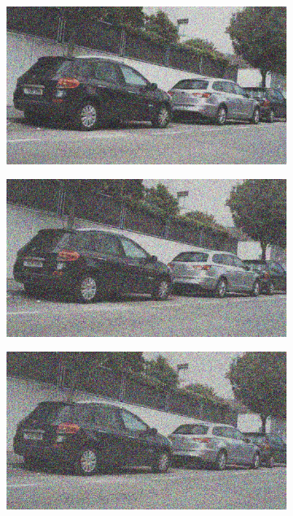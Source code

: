 \documentclass[a4paper]{ctexart}
\begin{document}
\begin{figure}[htbp]
\begin{subfigure}{0.08\textwidth}
			\label{fig：Gamma=0.6, Gauss Noise = 0.4}
		\end{subfigure}
		\begin{subfigure}{0.08\textwidth}
			\captionsetup{font=scriptsize}
			\includegraphics[width=\linewidth]{picture/Edge Detection/degrade/RGB_001 Gamma=0.6, Gauss Noise=0.5}
			\label{fig：Gamma=0.6, Gauss Noise = 0.5}
		\end{subfigure}
		\begin{subfigure}{0.08\textwidth}
			\captionsetup{font=scriptsize}
			\includegraphics[width=\linewidth]{picture/Edge Detection/degrade/RGB_001 Gamma=0.6, Gauss Noise=0.6}
			\label{fig：Gamma=0.6, Gauss Noise = 0.6}
		\end{subfigure}
		\begin{subfigure}{0.08\textwidth}
			\captionsetup{font=scriptsize}
			\includegraphics[width=\linewidth]{picture/Edge Detection/degrade/RGB_001 Gamma=0.6, Gauss Noise=0.7}

\end{subfigure}
\end{figure}
\end{document}

